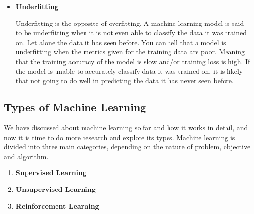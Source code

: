 \begin{itemize}
  \item  \textbf{Underfitting}
  \par
  Underfitting is the opposite of overfitting. A machine learning model is said to be underfitting when it is not even able to classify the data it was trained on. Let alone the data it has seen before. You can tell that a model is underfitting when the metrics given for the training data are poor. Meaning that the training accuracy of the model is slow and/or training loss is high. If the model is unable to accurately classify data it was trained on, it is likely that not going to do well in predicting the data it has never seen before.
\end{itemize}
\subsection{Types of Machine Learning}
We have discussed about machine learning so far and how it works in detail, and now it is time to do more research and explore its types. Machine learning is divided into three main categories, depending on the nature of problem, objective and algorithm.
\begin{enumerate}
    \item \textbf{Supervised Learning}
    \item \textbf{Unsupervised Learning}
    \item \textbf{Reinforcement Learning}
\end{enumerate}
